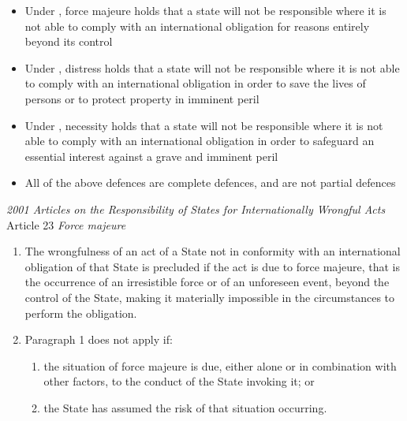 \begin{itemize}
    \item Under , force majeure holds that a state will not be responsible where it is not able to comply with an international obligation for reasons entirely beyond its control
    \item Under , distress holds that a state will not be responsible where it is not able to comply with an international obligation in order to save the lives of persons or to protect property in imminent peril
    \item Under , necessity holds that a state will not be responsible where it is not able to comply with an international obligation in order to safeguard an essential interest against a grave and imminent peril
    \item All of the above defences are complete defences, and are not partial defences
\end{itemize}

\begin{conventiondetails}{\textit{2001 Articles on the Responsibility of States for Internationally Wrongful Acts} Article 23}
    \flushleft
    \textit{Force majeure}

    \begin{enumerate}
        \item The wrongfulness of an act of a State not in conformity with an international obligation of that State is precluded if the act is due to force majeure, that is the occurrence of an irresistible force or of an unforeseen event, beyond the control of the State, making it materially impossible in the circumstances to perform the obligation.
        \item Paragraph 1 does not apply if:
        \begin{enumerate}[label=(\alph*)]
            \item the situation of force majeure is due, either alone or in combination with other factors, to the conduct of the State invoking it; or
            \item the State has  assumed the risk of that situation occurring.
        \end{enumerate}
    \end{enumerate}
\end{conventiondetails}


